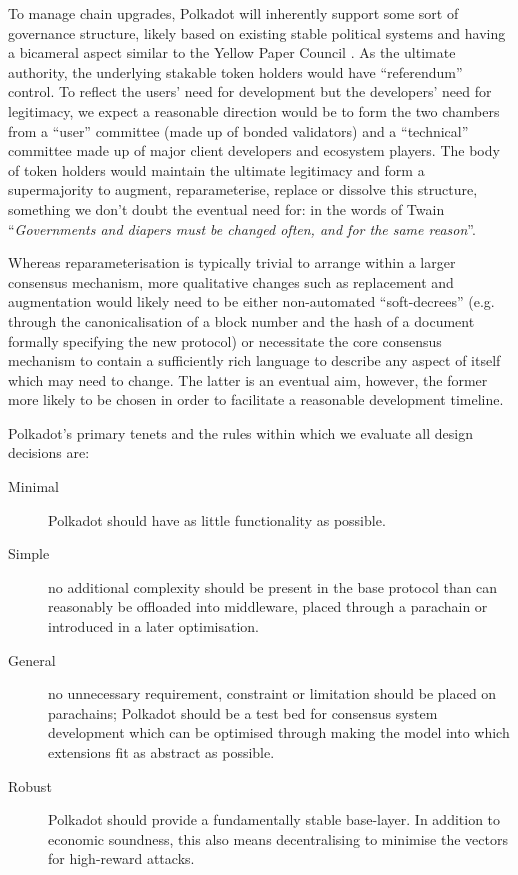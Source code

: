 \documentclass[9pt,oneside]{amsart}
\begin{document}
\begin{multicols}{2}
 To manage chain upgrades, Polkadot will inherently support some sort of governance structure, likely based on existing stable political systems and having a bicameral aspect similar to the Yellow Paper Council \cite{wood2016committee}. As the ultimate authority, the underlying stakable token holders would have ``referendum'' control. To reflect the users' need for development but the developers' need for legitimacy, we expect a reasonable direction would be to form the two chambers from a ``user'' committee (made up of bonded validators) and a ``technical'' committee made up of major client developers and ecosystem players. The body of token holders would maintain the ultimate legitimacy and form a supermajority to augment, reparameterise, replace or dissolve this structure, something we don't doubt the eventual need for: in the words of Twain ``\emph{Governments and diapers must be changed often, and for the same reason}''.

 Whereas reparameterisation is typically trivial to arrange within a larger consensus mechanism, more qualitative changes such as replacement and augmentation would likely need to be either non-automated ``soft-decrees'' (e.g. through the canonicalisation of a block number and the hash of a document formally specifying the new protocol) or necessitate the core consensus mechanism to contain a sufficiently rich language to describe any aspect of itself which may need to change. The latter is an eventual aim, however, the former more likely to be chosen in order to facilitate a reasonable development timeline.

 Polkadot's primary tenets and the rules within which we evaluate all design decisions are:

\begin{description}
\item[Minimal] Polkadot should have as little functionality as possible.
\item[Simple] no additional complexity should be present in the base protocol than can reasonably be offloaded into middleware, placed through a parachain or introduced in a later optimisation.
\item[General] no unnecessary requirement, constraint or limitation should be placed on parachains; Polkadot should be a test bed for consensus system development which can be optimised through making the model into which extensions fit as abstract as possible.
\item[Robust] Polkadot should provide a fundamentally stable base-layer. In addition to economic soundness, this also means decentralising to minimise the vectors for high-reward attacks.
\end{description}


\end{multicols}
\end{document}
